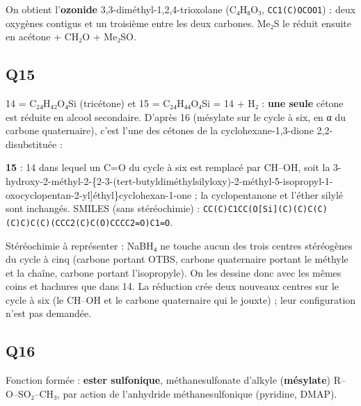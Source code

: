 \documentclass[11pt,a4paper]{article}
\begin{document}
On obtient l'\textbf{ozonide} 3,3-\allowbreak{}diméthyl-\allowbreak{}1,2,4-\allowbreak{}trioxolane (C₄H₈O₃, \texttt{CC1(C)OCOO1}) : deux oxygènes contigus et un troisième entre les deux carbones. Me₂S le réduit ensuite en acétone + CH₂O + Me₂SO.

\hypertarget{q15}{%
\subsection{Q15}\label{q15}}

14 = C₂₄H₄₂O₄Si (tricétone) et 15 = C₂₄H₄₄O₄Si = 14 + H₂ : \textbf{une seule} cétone est réduite en alcool secondaire. D'après 16 (mésylate sur le cycle à six, en α du carbone quaternaire), c'est l'une des cétones de la cyclohexane-1,3-dione 2,2-disubstituée :

\textbf{15} : 14 dans lequel un C=O du cycle à six est remplacé par CH--OH, soit la 3-\allowbreak{}hydroxy-\allowbreak{}2-\allowbreak{}méthyl-\allowbreak{}2-\allowbreak{}\{2-\allowbreak{}{[}3-\allowbreak{}(tert-\allowbreak{}butyldiméthylsilyloxy)-\allowbreak{}2-\allowbreak{}méthyl-\allowbreak{}5-\allowbreak{}isopropyl-\allowbreak{}1-\allowbreak{}oxocyclopentan-\allowbreak{}2-\allowbreak{}yl{]}éthyl\}cyclohexan-\allowbreak{}1-\allowbreak{}one ; la cyclopentanone et l'éther silylé sont inchangés. SMILES (sans stéréochimie) : \texttt{CC(\allowbreak{}C)\allowbreak{}C1CC(\allowbreak{}O{[}Si{]}\allowbreak{}(\allowbreak{}C)\allowbreak{}(\allowbreak{}C)\allowbreak{}C(\allowbreak{}C)\allowbreak{}(\allowbreak{}C)\allowbreak{}C)\allowbreak{}C(\allowbreak{}C)\allowbreak{}(\allowbreak{}CCC2(\allowbreak{}C)\allowbreak{}C(\allowbreak{}O)\allowbreak{}CCCC2=\allowbreak{}O)\allowbreak{}C1=\allowbreak{}O}.

Stéréochimie à représenter : NaBH₄ ne touche aucun des trois centres stéréogènes du cycle à cinq (carbone portant OTBS, carbone quaternaire portant le méthyle et la chaîne, carbone portant l'isopropyle). On les dessine donc avec les mêmes coins et hachures que dans 14. La réduction crée deux nouveaux centres sur le cycle à six (le CH--OH et le carbone quaternaire qui le jouxte) ; leur configuration n'est pas demandée.

\hypertarget{q16}{%
\subsection{Q16}\label{q16}}

Fonction formée : \textbf{ester sulfonique}, méthanesulfonate d'alkyle (\textbf{mésylate}) R--O--SO₂--CH₃, par action de l'anhydride méthanesulfonique (pyridine, DMAP).
\end{document}
